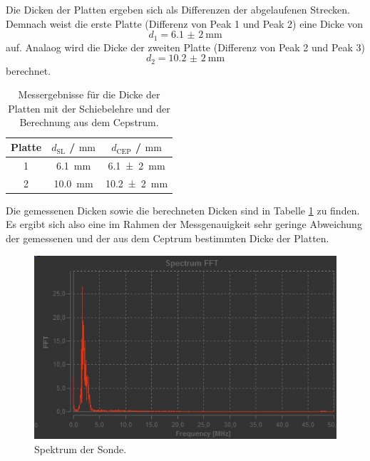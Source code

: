 Die Dicken der Platten ergeben sich als Differenzen der abgelaufenen Strecken.
Demnach weist die erste Platte (Differenz von Peak 1 und Peak 2) eine Dicke von
\begin{equation*}
	d_1 = \SI{6,1(2)}{\milli\meter}
\end{equation*}
auf.
Analaog wird die Dicke der zweiten Platte (Differenz von Peak 2 und Peak 3)
\begin{equation*}
	d_2 = \SI{10,2(2)}{\milli\meter}
\end{equation*}
berechnet.
\begin{table}
\centering
	\caption{Messergebnisse für die Dicke der Platten mit der Schiebelehre und der Berechnung aus dem Cepstrum.}
\label{tab:ceperg}
	\begin{tabular}{ccc}
	\toprule
		Platte & $d_{\mathrm{SL}}$ / $\si{\milli\meter}$ & $d_{\mathrm{CEP}}$ / $\si{\milli\meter}$ \\
	\midrule
		1 & \SI{6,1}{\milli\meter} & \SI{6,1(2)}{\milli\meter} \\
		2 & \SI{10,0}{\milli\meter} & \SI{10,2(2)}{\milli\meter} \\
	\bottomrule
	\end{tabular}
\end{table}
Die gemessenen Dicken sowie die berechneten Dicken sind in Tabelle \ref{tab:ceperg} zu finden.
Es ergibt sich also eine im Rahmen der Messgenauigkeit sehr geringe Abweichung der gemessenen
und der aus dem Ceptrum bestimmten Dicke der Platten.
\begin{figure}
  \centering
  \includegraphics{Messdaten/fft.jpg}
  \caption{Spektrum der Sonde.}
  \label{fig:spektrum}
\end{figure}

\FloatBarrier
